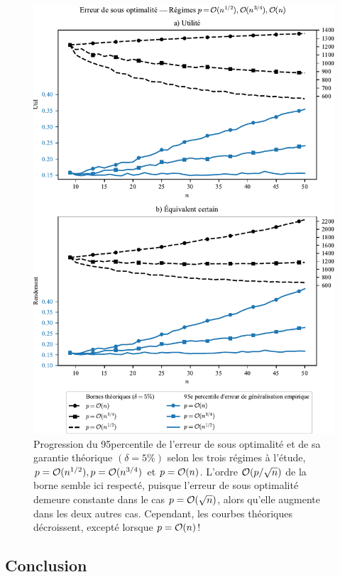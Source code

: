 \begin{figure}[p]
  \centering
  \includegraphics[width=\textwidth]{../experiments/fig/bound_test.pdf}
  \caption[Erreur de sous optimalité -- Régimes $p=\bigO(n^{1/2}),\bigO(n^{3/4}),\bigO(n)$]
  {Progression du 95\ieme percentile de l'erreur de sous optimalité et de sa garantie
    théorique $(\delta=5\%)$ selon les trois régimes à l'étude,
    $p=\mathcal O(n^{1/2}),p=\mathcal O(n^{3/4})$ et $p=\mathcal O(n)$. L'ordre $\mathcal O(p/\sqrt{n})$ de la
    borne semble ici respecté, puisque l'erreur de sous optimalité demeure constante dans
    le cas $p=\mathcal O(\sqrt{n})$, alors qu'elle augmente dans les deux autres
    cas. Cependant, les courbes théoriques décroissent, excepté lorsque $p=\mathcal O(n)$!}
  \label{fig_bound_npgsou}
\end{figure}

\subsection{Conclusion}

